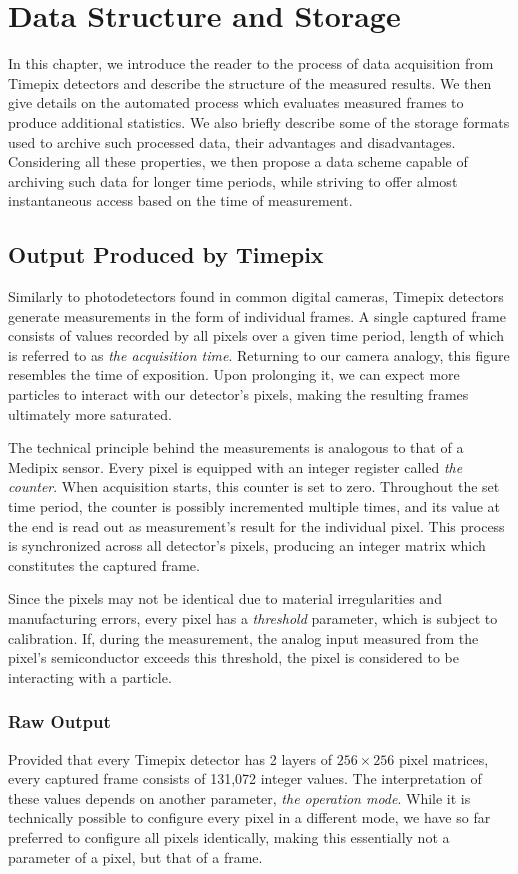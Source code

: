 \chapter{Data Structure and Storage}
In this chapter, we introduce the reader to the process of data acquisition from Timepix detectors and describe the structure of the measured results. We then give details on the automated process which evaluates measured frames to produce additional statistics. We also briefly describe some of the storage formats used to archive such processed data, their advantages and disadvantages. Considering all these properties, we then propose a data scheme capable of archiving such data for longer time periods, while striving to offer almost instantaneous access based on the time of measurement.


\section{Output Produced by Timepix}
Similarly to photodetectors found in common digital cameras, Timepix detectors generate measurements in the form of individual frames. A single captured frame consists of values recorded by all pixels over a given time period, length of which is referred to as \textit{the acquisition time}. Returning to our camera analogy, this figure resembles the time of exposition. Upon prolonging it, we can expect more particles to interact with our detector's pixels, making the resulting frames ultimately more saturated.

The technical principle behind the measurements is analogous to that of a Medipix sensor. Every pixel is equipped with an integer register called \textit{the counter}. When acquisition starts, this counter is set to zero. Throughout the set time period, the counter is possibly incremented multiple times, and its value at the end is read out as measurement's result for the individual pixel. This process is synchronized across all detector's pixels, producing an integer matrix which constitutes the captured frame.

Since the pixels may not be identical due to material irregularities and manufacturing errors, every pixel has a \textit{threshold} parameter, which is subject to calibration. If, during the measurement, the analog input measured from the pixel's semiconductor exceeds this threshold, the pixel is considered to be interacting with a particle.


\subsection{Raw Output}
Provided that every Timepix detector has 2 layers of $256 \times 256$ pixel matrices, every captured frame consists of 131,072 integer values. The interpretation of these values depends on another parameter, \textit{the operation mode}. While it is technically possible to configure every pixel in a different mode, we have so far preferred to configure all pixels identically, making this essentially not a parameter of a pixel, but that of a frame.

